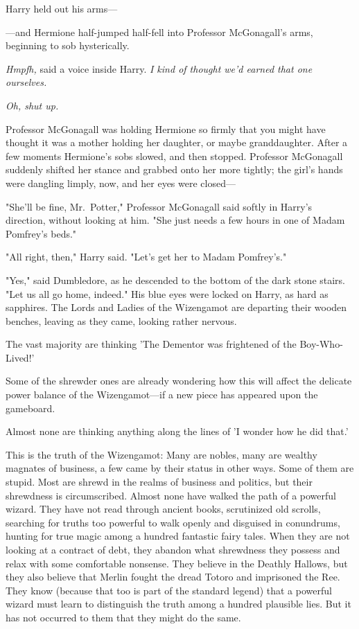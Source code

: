 Harry held out his arms---

---and Hermione half-jumped half-fell into Professor McGonagall's arms, 
beginning to sob hysterically.

\emph{Hmpfh,} said a voice inside Harry. \emph{I kind of thought we'd earned 
that one ourselves.}

\emph{Oh, shut up.}

Professor McGonagall was holding Hermione so firmly that you might have thought 
it was a mother holding her daughter, or maybe granddaughter. After a few 
moments Hermione's sobs slowed, and then stopped. Professor McGonagall suddenly 
shifted her stance and grabbed onto her more tightly; the girl's hands were 
dangling limply, now, and her eyes were closed---

"She'll be fine, Mr.~Potter," Professor McGonagall said softly in Harry's 
direction, without looking at him. "She just needs a few hours in one of Madam 
Pomfrey's beds."

"All right, then," Harry said. "Let's get her to Madam Pomfrey's."

"Yes," said Dumbledore, as he descended to the bottom of the dark stone stairs. 
"Let us all go home, indeed." His blue eyes were locked on Harry, as hard as 
sapphires.
\sbreak
The Lords and Ladies of the Wizengamot are departing their wooden benches, 
leaving as they came, looking rather nervous.

The vast majority are thinking 'The Dementor was frightened of the 
Boy-Who-Lived!'

Some of the shrewder ones are already wondering how this will affect the 
delicate power balance of the Wizengamot---if a new piece has appeared upon the 
gameboard.

Almost none are thinking anything along the lines of 'I wonder how he did that.'

This is the truth of the Wizengamot: Many are nobles, many are wealthy magnates 
of business, a few came by their status in other ways. Some of them are stupid. 
Most are shrewd in the realms of business and politics, but their shrewdness is 
circumscribed. Almost none have walked the path of a powerful wizard. They have 
not read through ancient books, scrutinized old scrolls, searching for truths 
too powerful to walk openly and disguised in conundrums, hunting for true magic 
among a hundred fantastic fairy tales. When they are not looking at a contract 
of debt, they abandon what shrewdness they possess and relax with some 
comfortable nonsense. They believe in the Deathly Hallows, but they also 
believe that Merlin fought the dread Totoro and imprisoned the Ree. They know 
(because that too is part of the standard legend) that a powerful wizard must 
learn to distinguish the truth among a hundred plausible lies. But it has not 
occurred to them that they might do the same.

